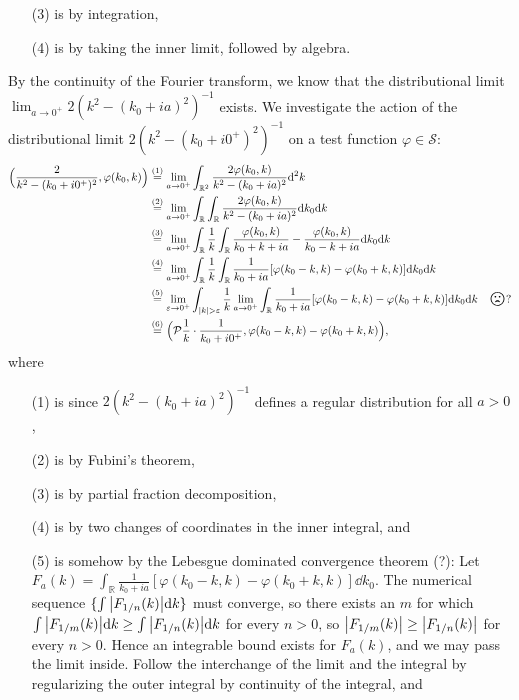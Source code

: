 \documentclass[11pt]{article}
\newcommand{\eq}[1]{\overset{(#1)}{=}}
\newcommand{\sad}{\raisebox{-.28em}{\resizebox{1.5em}{!}{\frownie}}}
\DeclareMathOperator{\mathsad}{\!\sad\!}
\begin{document}
\begin{enumerate}
\begin{enumerate}[label=(\roman*)]
\begin{enumerate}
            \item[(3)] is by integration,
            \item[(4)] is by taking the inner limit, followed by algebra.
        \end{enumerate}
        By the continuity of the Fourier transform, we know that the distributional limit $\lim_{a\to 0^+}  2(k^2-(k_0+ia)^2)^{-1}$ exists. We investigate the action of the distributional limit $2(k^2-(k_0+i0^+)^2)^{-1}$ on a test function $\varphi\in\mathcal S$:
        \begin{align*}
            \Big(\frac{2}{k^2-(k_0+i0^+)^2}, \varphi(k_0,k)\Big) &\eq{1} \lim_{a\to 0^+}\int_{\mathbb R^2} \frac{2\varphi(k_0,k)}{k^2-(k_0+ia)^2}\dd^2k\\
            &\eq{2} \lim_{a\to 0^+}\int_{\mathbb R}\int_{\mathbb R} \frac{2\varphi(k_0,k)}{k^2-(k_0+ia)^2} \dd k_0 \dd k\\
            &\eq{3} \lim_{a\to 0^+} \int_{\mathbb R}\frac{1}{k} \int_{\mathbb R} \frac{\varphi(k_0,k)}{k_0+k+ia} - \frac{\varphi(k_0,k)}{k_0-k+ia} \dd k_0 \dd k \\ 
            &\eq{4} \lim_{a\to 0^+} \int_{\mathbb R}\frac{1}{k} \int_{\mathbb R} \frac{1}{k_0+ia}[\varphi(k_0-k,k) - \varphi(k_0+k,k)] \dd k_0 \dd k\\
            &\eq{5} \lim_{\varepsilon\to 0^+}\int_{\abs{k}>\varepsilon}\frac{1}{k} \lim_{a\to 0^+}\int_{\mathbb R} \frac{1}{k_0+ia}[\varphi(k_0-k,k) - \varphi(k_0+k,k)] \dd k_0 \dd k \quad\mathsad\,?\\
            &\eq{6} \Big(\mathcal P\frac{1}{k} \cdot \frac{1}{k_0+i0^+}, \varphi(k_0-k,k) - \varphi(k_0+k,k)\Big),
        \end{align*} where 
        \begin{enumerate}
            \item[(1)] is since $2(k^2-(k_0+ia)^2)^{-1}$ defines a regular distribution for all $a>0$,
            \item[(2)] is by Fubini's theorem,
            \item[(3)] is by partial fraction decomposition, 
            \item[(4)] is by two changes of coordinates in the inner integral, and
            \item[(5)] is somehow by the Lebesgue dominated convergence theorem (?): Let $F_a(k) = \int_{\mathbb R} \frac{1}{k_0+ia}[\varphi(k_0-k,k) - \varphi(k_0+k,k)] \dd k_0$. The numerical sequence $\{\int\abs{F_{1/n}(k)}\dd k\}$ must converge, so there exists an $m$ for which $\int\abs{F_{1/m}(k)}\dd k\geq \int\abs{F_{1/n}(k)}\dd k$ for every $n>0$, so $\abs{F_{1/m}(k)}\geq \abs{F_{1/n}(k)}$ for every $n>0$. Hence an integrable bound exists for $F_a(k)$, and we may pass the limit inside. Follow the interchange of the limit and the integral by regularizing the outer integral by continuity of the integral, and

\end{enumerate}
\end{enumerate}
\end{enumerate}
\end{document}
